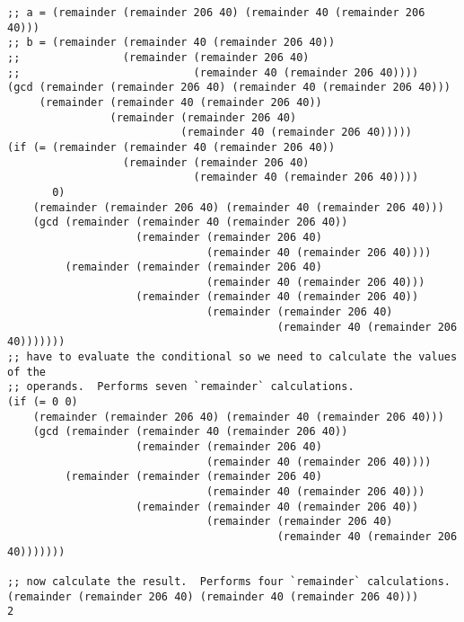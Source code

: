 \documentclass{article}
\begin{document}
\begin{lstlisting}[style=scheme]
;; a = (remainder (remainder 206 40) (remainder 40 (remainder 206 40)))
;; b = (remainder (remainder 40 (remainder 206 40))
;;                (remainder (remainder 206 40)
;;                           (remainder 40 (remainder 206 40))))
(gcd (remainder (remainder 206 40) (remainder 40 (remainder 206 40)))
     (remainder (remainder 40 (remainder 206 40))
                (remainder (remainder 206 40)
                           (remainder 40 (remainder 206 40)))))
(if (= (remainder (remainder 40 (remainder 206 40))
                  (remainder (remainder 206 40)
                             (remainder 40 (remainder 206 40))))
       0)
    (remainder (remainder 206 40) (remainder 40 (remainder 206 40)))
    (gcd (remainder (remainder 40 (remainder 206 40))
                    (remainder (remainder 206 40)
                               (remainder 40 (remainder 206 40))))
         (remainder (remainder (remainder 206 40)
                               (remainder 40 (remainder 206 40)))
                    (remainder (remainder 40 (remainder 206 40))
                               (remainder (remainder 206 40)
                                          (remainder 40 (remainder 206 40)))))))
;; have to evaluate the conditional so we need to calculate the values of the
;; operands.  Performs seven `remainder` calculations.
(if (= 0 0)
    (remainder (remainder 206 40) (remainder 40 (remainder 206 40)))
    (gcd (remainder (remainder 40 (remainder 206 40))
                    (remainder (remainder 206 40)
                               (remainder 40 (remainder 206 40))))
         (remainder (remainder (remainder 206 40)
                               (remainder 40 (remainder 206 40)))
                    (remainder (remainder 40 (remainder 206 40))
                               (remainder (remainder 206 40)
                                          (remainder 40 (remainder 206 40)))))))

;; now calculate the result.  Performs four `remainder` calculations.
(remainder (remainder 206 40) (remainder 40 (remainder 206 40)))
2
\end{lstlisting}
\end{document}

